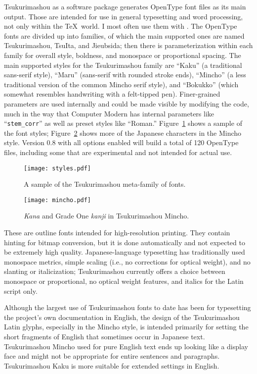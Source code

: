 \documentclass{ltugboat}
\begin{document}
Tsukurimashou as a software package generates OpenType font files as its
main output.  Those are intended for use in general typesetting and word
processing, not only within the \TeX\ world.  I most often use them with
\XeTeX.  The OpenType fonts are divided up into families, of which the main
supported ones are named Tsukurimashou, TsuIta, and Jieubsida; then there is
parameterization within each family for overall style, boldness, and
monospace or proportional spacing.  The main supported styles for the
Tsukurimashou family are ``Kaku'' (a traditional sans-serif style),
``Maru'' (sans-serif with rounded stroke ends),
``Mincho'' (a less traditional version of the common Mincho serif style),
and ``Bokukko'' (which somewhat resembles handwriting with a felt-tipped
pen).  Finer-grained parameters are used internally and could be made
visible by modifying the code, much in the way that Computer Modern has
internal parameters like ``\verb|stem_corr|'' as well as preset styles like
``Roman.'' Figure~\ref{fig:styles} shows a sample of the font styles;
Figure~\ref{fig:mincho} shows more of the Japanese characters in the Mincho
style.  Version 0.8
with all options enabled will build a total of 120 OpenType files, including
some that are experimental and not intended for actual use.

\begin{figure}
\texttt{[image: styles.pdf]}
\caption{A sample of the Tsukurimashou meta-family of fonts.}
\label{fig:styles}
\end{figure}

\begin{figure}
\texttt{[image: mincho.pdf]}
\caption{\emph{Kana} and Grade One \emph{kanji} in Tsukurimashou Mincho.}
\label{fig:mincho}
\end{figure}

These are outline fonts intended for high-resolution printing.  They contain
hinting for bitmap conversion, but it is done automatically and not expected
to be extremely high quality.  Japanese-language typesetting has
traditionally used monospace metrics, simple scaling (i.e., no corrections
for optical weight), and no slanting or italicization; Tsukurimashou
currently offers a choice between monospace or proportional, no optical
weight features, and italics for the Latin script only.

Although the largest use of Tsukurimashou fonts to date has been for
typesetting the project's own documentation in English, the design of the
Tsukurimashou Latin glyphs, especially in the Mincho style, is intended
primarily for setting the short fragments of English that sometimes occur in
Japanese text.  Tsukurimashou Mincho used for pure English text ends up
looking like a display face and might not be appropriate for entire
sentences and paragraphs.  Tsukurimashou Kaku is more suitable for extended
settings in English.
\end{document}
